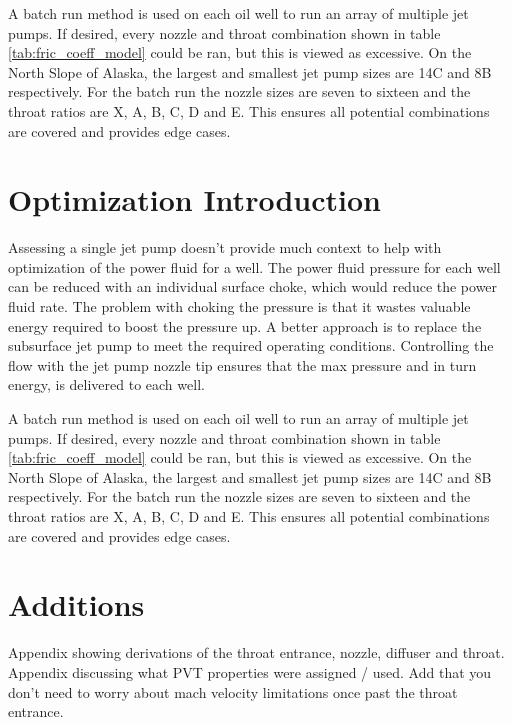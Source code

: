 \documentclass[12 pt]{report}
\begin{document}
A batch run method is used on each oil well to run an array of multiple jet pumps. If desired, every nozzle and throat combination shown in table \ref{tab:fric_coeff_model} could be ran, but this is viewed as excessive. On the North Slope of Alaska, the largest and smallest jet pump sizes are 14C and 8B respectively. For the batch run the nozzle sizes are seven to sixteen and the throat ratios are X, A, B, C, D and E. This ensures all potential combinations are covered and provides edge cases. 

\section{Optimization Introduction}

Assessing a single jet pump doesn't provide much context to help with optimization of the power fluid for a well. The power fluid pressure for each well can be reduced with an individual surface choke, which would reduce the power fluid rate. The problem with choking the pressure is that it wastes valuable energy required to boost the pressure up. A better approach is to replace the subsurface jet pump to meet the required operating conditions. Controlling the flow with the jet pump nozzle tip ensures that the max pressure and in turn energy, is delivered to each well.

A batch run method is used on each oil well to run an array of multiple jet pumps. If desired, every nozzle and throat combination shown in table \ref{tab:fric_coeff_model} could be ran, but this is viewed as excessive. On the North Slope of Alaska, the largest and smallest jet pump sizes are 14C and 8B respectively. For the batch run the nozzle sizes are seven to sixteen and the throat ratios are X, A, B, C, D and E. This ensures all potential combinations are covered and provides edge cases.


\section{Additions}
Appendix showing derivations of the throat entrance, nozzle, diffuser and throat. Appendix discussing what PVT properties were assigned / used. Add that you don't need to worry about mach velocity limitations once past the throat entrance. \cite{kermit}

\printbibliography
\end{document}
